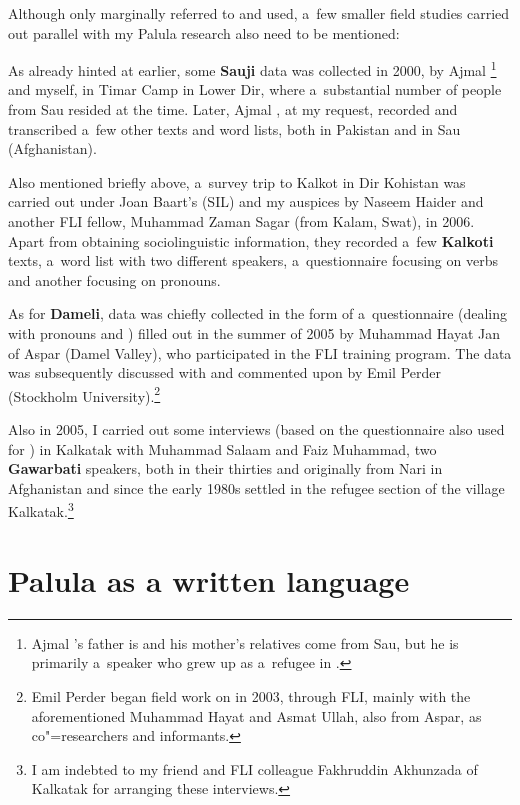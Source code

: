 Although only marginally referred to and used, a~few smaller field studies carried out parallel with
my Palula research also need to be mentioned:


As already hinted at earlier, some \textbf{Sauji} data was collected in 2000, by Ajmal
\iliNuristani\footnote{Ajmal \iliNuristani's father is \iliNuristani and his mother's relatives come from Sau,
  but he is primarily a~\iliPashto speaker who grew up as a~refugee in \iliChitral.} and myself, in Timar
Camp in Lower Dir, where a~substantial number of people from Sau resided at the time. Later, Ajmal
\iliNuristani, at my request, recorded and transcribed a~few other texts and word lists, both in
Pakistan and in Sau (Afghanistan).


Also mentioned briefly above, a~survey trip to Kalkot in Dir Kohistan was carried out under Joan
Baart's (SIL) and my auspices by Naseem Haider and another FLI fellow, Muhammad Zaman Sagar (from
Kalam, Swat), in 2006. Apart from obtaining sociolinguistic information, they recorded a~few
\textbf{Kalkoti} texts, a~word list with two different speakers, a~questionnaire focusing on verbs
and another focusing on pronouns.


As for \textbf{Dameli}, data was chiefly collected in the form of a~questionnaire (dealing with
pronouns and ) filled out in the summer of 2005 by Muhammad Hayat Jan of Aspar (Damel
Valley), who participated in the FLI training program. The data was subsequently discussed with and
commented upon by Emil Perder (Stockholm University).\footnote{Emil Perder began field work on
  \iliDameli in 2003, through FLI, mainly with the aforementioned Muhammad Hayat and Asmat Ullah, also
  from Aspar, as co"=researchers and informants.}


Also in 2005, I carried out some interviews (based on the questionnaire also used for \iliDameli) in Kalkatak with Muhammad Salaam and Faiz Muhammad, two \textbf{Gawarbati} speakers, both in their thirties and originally from Nari in Afghanistan and since the early 1980s settled in the refugee section of the village Kalkatak.\footnote{I am indebted to my friend and FLI colleague Fakhruddin Akhunzada of Kalkatak for arranging these interviews.}


\section{Palula as a written language}
\label{sec:1-6b}

